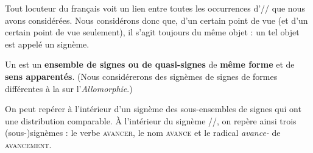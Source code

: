 Tout locuteur du français voit un lien entre toutes les occurrences d’// que nous avons considérées. Nous considérons donc que, d’un certain point de vue (et d’un certain point de vue seulement), il s’agit toujours du même objet : un tel objet est appelé un signème.

\begin{styleLivreImportant}
Un  est un \textbf{ensemble de signes ou de quasi-signes} de \textbf{même forme} et de \textbf{sens apparentés}. (Nous considérerons des signèmes de signes de formes différentes à la  sur l’\textit{Allomorphie}.)
\end{styleLivreImportant}

On peut repérer à l’intérieur d’un signème des sous-ensembles de signes qui ont une distribution comparable. À l’intérieur du signème //, on repère ainsi trois (sous-)signèmes : le verbe \textsc{avancer}, le nom \textsc{avance} et le radical \textit{avance-} de \textsc{avancement}.

